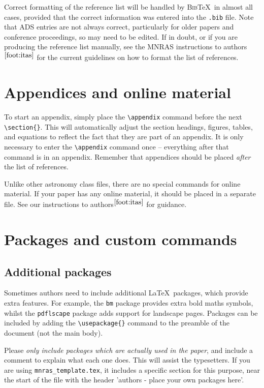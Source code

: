 \documentclass[a4paper,fleqn,usenatbib,useAMS]{mnras}
\newcommand{\bibtex}{\textsc{Bib}\!\TeX} %
\begin{document}
Correct formatting of the reference list will be handled by \bibtex\ in almost all cases, provided that the correct information was entered into the \verb'.bib' file.
Note that ADS entries are not always correct, particularly for older papers and conference proceedings, so may need to be edited.
If in doubt, or if you are producing the reference list manually, see the MNRAS instructions to authors$^{\ref{foot:itas}}$ for the current guidelines on how to format the list of references.

\section{Appendices and online material}

To start an appendix, simply place the \verb'\appendix' command before the next \verb'\section{}'.
This will automatically adjust the section headings, figures, tables, and equations to reflect the fact that they are part of an appendix.
It is only necessary to enter the \verb'\appendix' command once -- everything after that command is in an appendix.
Remember that appendices should be placed \textit{after} the list of references.

Unlike other astronomy class files, there are no special commands for online material.
If your paper has any online material, it should be placed in a separate file.
See our instructions to authors$^{\ref{foot:itas}}$ for guidance.

\section{Packages and custom commands}
\label{sec:packages}
\subsection{Additional packages}

Sometimes authors need to include additional \LaTeX\ packages, which provide extra features.
For example, the \verb'bm' package provides extra bold maths symbols, whilst the \verb'pdflscape' package adds support for landscape pages.
Packages can be included by adding the \verb'\usepackage{}' command to the preamble of the document (not the main body).

Please \emph{only include packages which are actually used in the paper}, and include a comment to explain what each one does.
This will assist the typesetters.
If you are using \texttt{mnras\_template.tex}, it includes a specific section for this purpose, near the start of the file with the header 'authors - place your own packages here'.
\end{document}
